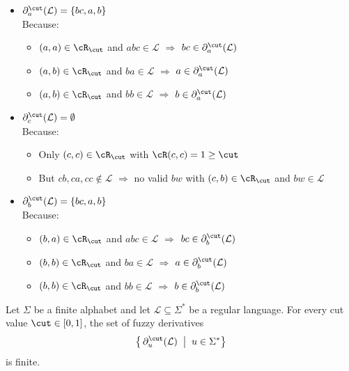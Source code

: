 \begin{itemize}
    \item $\partial_a^\cut(\mathcal{L}) = \{bc, a, b\}$\\
    Because:
    \begin{itemize}
        \item $(a,a) \in \cR_\cut$ and $abc \in \mathcal{L}$ $\Rightarrow$ $bc \in \partial_a^\cut(\mathcal{L})$
        \item $(a,b) \in \cR_\cut$ and $ba \in \mathcal{L}$ $\Rightarrow$ $a \in \partial_a^\cut(\mathcal{L})$
        \item $(a,b) \in \cR_\cut$ and $bb \in \mathcal{L}$ $\Rightarrow$ $b \in \partial_a^\cut(\mathcal{L})$
    \end{itemize}

    \item $\partial_c^\cut(\mathcal{L}) = \emptyset$\\
    Because:
    \begin{itemize}
        \item Only $(c,c) \in \cR_\cut$ with $\cR(c,c) = 1 \ge \cut$
        \item But $cb, ca, cc \notin \mathcal{L}$ $\Rightarrow$ no valid $bw$ with $(c,b) \in \cR_\cut$ and $bw \in \mathcal{L}$
    \end{itemize}

    \item $\partial_b^\cut(\mathcal{L}) = \{bc, a, b\}$\\
    Because:
    \begin{itemize}
        \item $(b,a) \in \cR_\cut$ and $abc \in \mathcal{L}$ $\Rightarrow$ $bc \in \partial_b^\cut(\mathcal{L})$
        \item $(b,b) \in \cR_\cut$ and $ba \in \mathcal{L}$ $\Rightarrow$ $a \in \partial_b^\cut(\mathcal{L})$
        \item $(b,b) \in \cR_\cut$ and $bb \in \mathcal{L}$ $\Rightarrow$ $b \in \partial_b^\cut(\mathcal{L})$
    \end{itemize}
\end{itemize}

\begin{theorem}\label{the:fuzzy-derivative-set-finite}
Let $\Sigma$ be a finite alphabet and let $\mathcal{L} \subseteq \Sigma^*$ be a
regular language. For every cut value $\cut \in [0,1]$, the set of fuzzy
derivatives
\[
  \bigl\{\, \partial_u^\cut(\mathcal{L}) \;\bigm|\; u \in \Sigma^* \bigr\}
\]
is finite.
\end{theorem}

